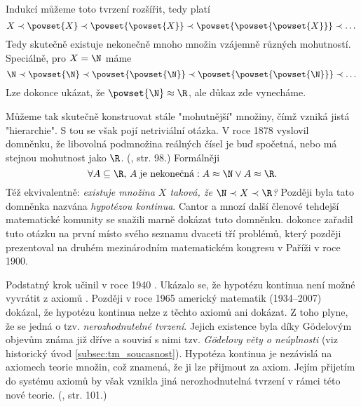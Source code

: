 \begin{remark}
    Indukcí můžeme toto tvrzení rozšířit, tedy platí
    \begin{equation*}
        X\prec\powset{X}\prec\powset{\powset{X}}\prec\powset{\powset{\powset{X}}}\prec\dots
    \end{equation*}
    Tedy skutečně existuje nekonečně mnoho množin vzájemně různých mohutností. Speciálně, pro $X=\N$ máme
    \begin{equation*}
        \N\prec\powset{\N}\prec\powset{\powset{\N}}\prec\powset{\powset{\powset{\N}}}\prec\dots
    \end{equation*}
    Lze dokonce ukázat, že $\powset{\N}\approx\R$, ale důkaz zde vynecháme.
\end{remark}
\medskip

Můžeme tak skutečně konstruovat stále "mohutnější" množiny, čímž vzniká jistá "hierarchie". S tou se však pojí netriviální otázka. V roce 1878 vyslovil  domněnku, že libovolná podmnožina reálných čísel je buď spočetná, nebo má stejnou mohutnost jako $\R$. (\cite{BalcarStepanek1986}, str. 98.) Formálněji
\begin{equation*}
    \forall A\subseteq\R,\,A\;\text{je nekonečná}: A\approx\N \lor A\approx\R.
\end{equation*}
Též ekvivalentně: \emph{existuje množina $X$ taková, že $\N\prec X\prec\R$?} Později byla tato domněnka nazvána \emph{hypotézou kontinua}. Cantor a mnozí další členové tehdejší matematické komunity se snažili marně dokázat tuto domněnku.  dokonce zařadil tuto otázku na první místo svého seznamu dvaceti tří problémů, který později prezentoval na druhém mezinárodním matematickém kongresu v Paříži v roce 1900.\par
Podstatný krok učinil v roce 1940 . Ukázalo se, že hypotézu kontinua není možné vyvrátit z axiomů \ZF{}. Později v roce 1965 americký matematik  (1934--2007) dokázal, že hypotézu kontinua nelze z těchto axiomů ani dokázat. Z toho plyne, že se jedná o tzv. \emph{nerozhodnutelné tvrzení}. Jejich existence byla díky Gödelovým objevům známa již dříve a souvisí s nimi tzv. \emph{Gödelovy věty o neúplnosti} (viz historický úvod \ref{subsec:tm_soucasnost}). Hypotéza kontinua je nezávislá na axiomech teorie množin, což znamená, že ji lze přijmout za axiom. Jejím přijetím do systému axiomů by však vznikla jiná nerozhodnutelná tvrzení v rámci této nové teorie. (\cite{Fuchs2003}, str. 101.)